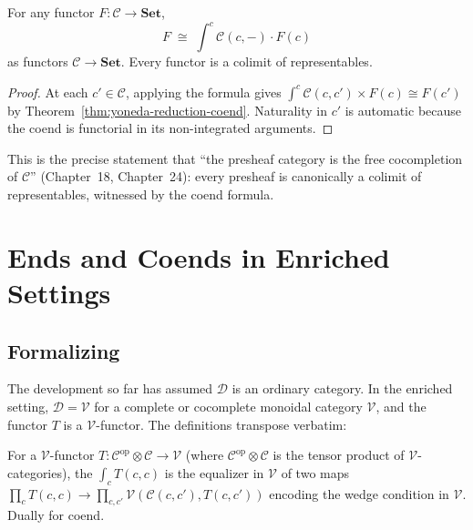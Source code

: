 \begin{theorem}
\label{thm:co-yoneda}
For any functor $F : \mathcal{C} \to \mathbf{Set}$,
\begin{equation*}
  F \;\cong\; \int^c \mathcal{C}(c, -) \cdot F(c)
\end{equation*}
as functors $\mathcal{C} \to \mathbf{Set}$. Every functor is a colimit of
representables.
\end{theorem}

\begin{proof}
At each $c' \in \mathcal{C}$, applying the formula gives $\int^c
\mathcal{C}(c, c') \times F(c) \cong F(c')$ by
Theorem~\ref{thm:yoneda-reduction-coend}. Naturality in $c'$ is automatic
because the coend is functorial in its non-integrated arguments.
\end{proof}

This is the precise statement that ``the presheaf category is the free
cocompletion of $\mathcal{C}$'' (Chapter~18, Chapter~24): every presheaf is
canonically a colimit of representables, witnessed by the coend formula.


\section{Ends and Coends in Enriched Settings}
\label{sec:enriched-ends-coends}

\subsection{Formalizing}

The development so far has assumed $\mathcal{D}$ is an ordinary category. In
the enriched setting, $\mathcal{D} = \mathcal{V}$ for a complete or cocomplete
monoidal category $\mathcal{V}$, and the functor $T$ is a $\mathcal{V}$-functor.
The definitions transpose verbatim:

\begin{definition}
\label{def:enriched-end-coend}
For a $\mathcal{V}$-functor $T : \mathcal{C}^{\mathrm{op}} \otimes \mathcal{C}
\to \mathcal{V}$ (where $\mathcal{C}^{\mathrm{op}} \otimes \mathcal{C}$ is
the tensor product of $\mathcal{V}$-categories), the 
$\int_c T(c, c)$ is the equalizer in $\mathcal{V}$ of two maps
$\prod_c T(c, c) \to \prod_{c, c'} \mathcal{V}(\mathcal{C}(c, c'), T(c, c'))$
encoding the wedge condition in $\mathcal{V}$. Dually for coend.
\end{definition}

